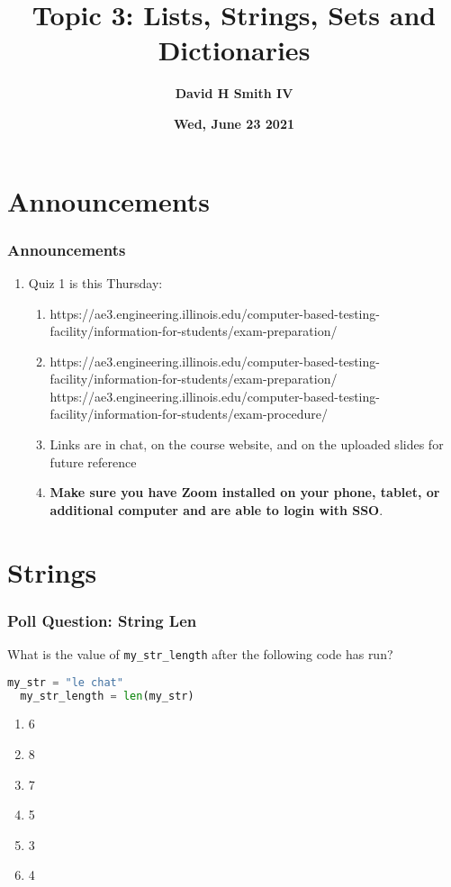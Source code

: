 \documentclass{beamer}
\title{\textbf{Topic 3: Lists, Strings, Sets and Dictionaries}}
\author{\textbf{David H Smith IV}}
\institute[\textbf{UIUC}]{\textbf{University of Illinois Urbana-Champaign}}
\date{\textbf{Wed, June 23 2021}}
\begin{document}
\frame{\titlepage}

\section{Announcements}

%
%
\begin{frame}
  \frametitle{Announcements}
  \begin{enumerate}
    \item Quiz 1 is this Thursday:
      \begin{enumerate}
        \item https://ae3.engineering.illinois.edu/computer-based-testing-facility/information-for-students/exam-preparation/
        \item https://ae3.engineering.illinois.edu/computer-based-testing-facility/information-for-students/exam-preparation/
          https://ae3.engineering.illinois.edu/computer-based-testing-facility/information-for-students/exam-procedure/ 
        \item Links are in chat, on the course website, and on the uploaded slides for future reference
        \item \textbf{Make sure you have Zoom installed on your phone, tablet, or additional computer and are able to login with SSO}.
      \end{enumerate}
  \end{enumerate}
\end{frame}

\section{Strings}
%
%
\begin{frame}[fragile]
  \frametitle{Poll Question: String Len}
  What is the value of \lstinline|my_str_length| after the following code has run?
  \begin{lstlisting}[language=Python, autogobble] 
  my_str = "le chat"
  my_str_length = len(my_str)
  \end{lstlisting}
  \vfill
  \begin{enumerate}[A]
    \item 6
    \item 8
    \item 7 %
    \item 5
    \item 3
    \item 4
  \end{enumerate}
\end{frame}
\end{document}
